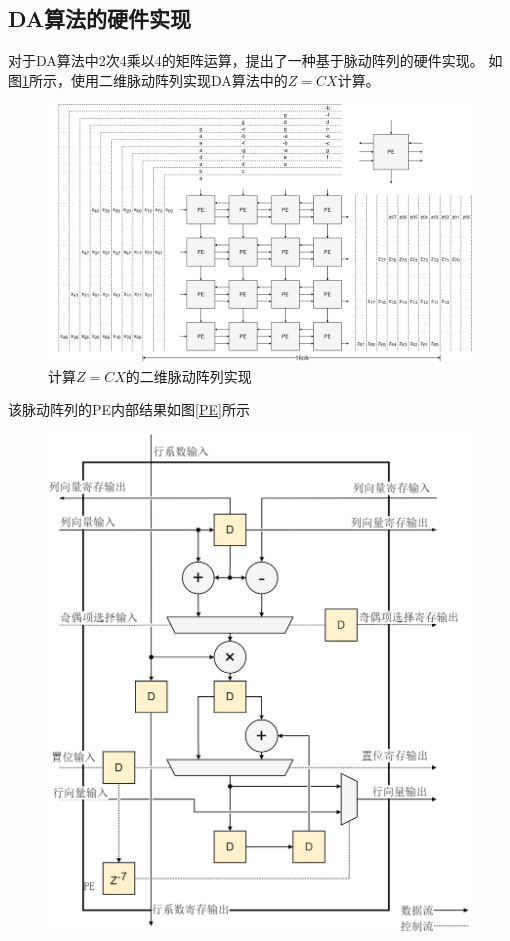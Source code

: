 \documentclass{article}
\numberwithin {equation}{section}
\begin{document}
\begin{spacing}{1.25}
    \subsection{DA算法的硬件实现}
      \vspace{1em}
      对于DA算法中2次4乘以4的矩阵运算，提出了一种基于脉动阵列的硬件实现。
      如图\ref{DCT脉动阵列}所示，使用二维脉动阵列实现DA算法中的$Z=CX$计算。
      \begin{figure}[H]
        \centering
        \includegraphics[scale=0.15]{./pictures/DCT脉动阵列.png}
        \caption{计算$Z=CX$的二维脉动阵列实现}
        \label{DCT脉动阵列}
      \end{figure}
      该脉动阵列的PE内部结果如图\ref{PE}所示
      \begin{figure}[H]
        \centering
        \includegraphics[scale=0.175]{./pictures/DCT_PE.png}

\end{figure}
\end{spacing}
\end{document}
